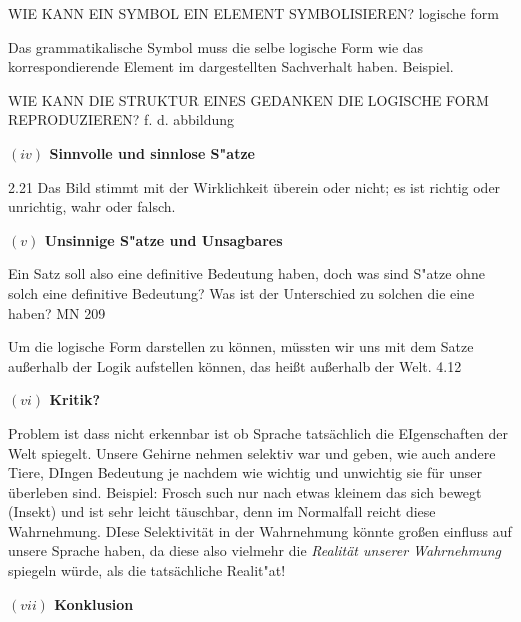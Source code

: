 \documentclass[a4paper, emulatestandardclasses, 12pt]{scrartcl}
\begin{document}
\begin{onehalfspace}
WIE KANN EIN SYMBOL EIN ELEMENT SYMBOLISIEREN? logische form

Das grammatikalische Symbol muss die selbe logische Form wie das korrespondierende Element im dargestellten Sachverhalt haben. Beispiel.

WIE KANN DIE STRUKTUR EINES GEDANKEN DIE LOGISCHE FORM REPRODUZIEREN? f. d. abbildung






\vspace{5mm}
\noindent\textbf{$(iv)$ Sinnvolle und sinnlose S"atze}	

2.21
Das Bild stimmt mit der Wirklichkeit überein oder nicht; es ist richtig oder unrichtig, wahr oder falsch.

\vspace{5mm}
\noindent\textbf{$(v)$ Unsinnige S"atze und Unsagbares}	

Ein Satz soll also eine definitive Bedeutung haben, doch was sind S"atze ohne solch eine definitive Bedeutung? Was ist der Unterschied zu solchen die eine haben? MN 209

Um die logische Form darstellen zu können, müssten wir uns mit dem Satze außerhalb der Logik aufstellen können, das heißt außerhalb der Welt. 4.12

\vspace{5mm}
\noindent\textbf{$(vi)$ Kritik?}	

Problem ist dass nicht erkennbar ist ob Sprache tatsächlich die EIgenschaften der Welt spiegelt. Unsere Gehirne nehmen selektiv war und geben, wie auch andere Tiere, DIngen Bedeutung je nachdem wie wichtig und unwichtig sie für unser überleben sind. Beispiel: Frosch such nur nach etwas kleinem das sich bewegt (Insekt) und ist sehr leicht täuschbar, denn im Normalfall reicht diese Wahrnehmung. DIese Selektivität in der Wahrnehmung könnte großen einfluss auf unsere Sprache haben, da diese also vielmehr die \emph{Realität unserer Wahrnehmung} spiegeln würde, als die tatsächliche Realit"at!

\vspace{5mm}
\noindent\textbf{$(vii)$ Konklusion}

\end{onehalfspace}
\nocite{*}

\end{document}
